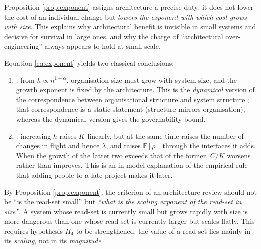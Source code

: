 \begin{corollary}\label{cor:arch-role}
Proposition \ref{prop:exponent} assigns architecture a precise duty: it does not lower the
cost of an individual change but \emph{lowers the exponent with which cost grows with size}.
This explains why architectural benefit is invisible in small systems and decisive for
survival in large ones, and why the charge of ``architectural over-engineering'' always
appears to hold at small scale.
\end{corollary}

\begin{corollary}\label{cor:brooks}
Equation \eqref{eq:exponent} yields two classical conclusions:
\begin{enumerate}[label=(\alph*)]
\item {}: from
      $h \propto n^{1+\alpha}$, organisation size must grow with system size, and the
      growth exponent is fixed by the architecture. This is the \emph{dynamical} version of
      the correspondence between organisational structure and system structure
      \cite{conway1968}; that correspondence is a static statement (structure mirrors
      organisation), whereas the dynamical version gives the governability bound.
\item {}: increasing $h$ raises $K$ linearly, but
      at the same time raises the number of changes in flight and hence $\lambda$, and
      raises $\mathbb{E}[\rho]$ through the interfaces it adds. When the growth of the
      latter two exceeds that of the former, $C/K$ worsens rather than improves. This is an
      in-model explanation of the empirical rule that adding people to a late project makes
      it later.
\end{enumerate}
\end{corollary}

\begin{principle}\label{pr:governable-design}
By Proposition \ref{prop:exponent}, the criterion of an architecture review should not be
``is the read-set small'' but \emph{``what is the scaling exponent of the read-set in
size''}. A system whose read-set is currently small but grows rapidly with size is more
dangerous than one whose read-set is currently larger but scales flatly. This requires
hypothesis $H_4$ to be strengthened: the value of a read-set lies mainly in its
\emph{scaling}, not in its \emph{magnitude}.
\end{principle}

